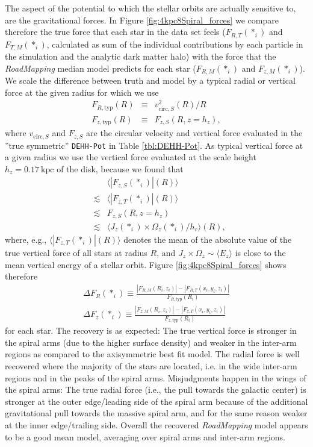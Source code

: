 \documentclass[iop,revtex4,numberedappendix,appendixfloats]{emulateapj}
\newcommand{\RM}{{\sl RoadMapping}}
\begin{document}
The aspect of the potential to which the stellar orbits are actually sensitive to, are the gravitational forces. In Figure \ref{fig:4kpc8Spiral_forces} we compare therefore the true force that each star in the data set feels ($F_{R,T}(*_i)$ and $F_{T,M}(*_i)$, calculated as sum of the individual contributions by each particle in the simulation and the analytic dark matter halo) with the force that the \RM{} median model predicts for each star ($F_{R,M}(*_i)$ and $F_{z,M}(*_i)$). We scale the difference between truth and model by a typical radial or vertical force at the given radius for which we use
\begin{eqnarray}
F_{R,\text{typ}}(R) &\equiv& v^2_{\text{circ},S}(R) / R\\
F_{z,\text{typ}}(R) &\equiv& F_{z,S}(R,z=h_z),
\end{eqnarray}
where $v_{\text{circ},S}$ and $F_{z,S}$ are the circular velocity and vertical force evaluated in the ''true symmetric'' \texttt{DEHH-Pot} in Table \ref{tbl:DEHH-Pot}. As typical vertical force at a given radius we use the vertical force evaluated at the scale height $h_z=0.17~\text{kpc}$ of the disk, because we found that 
\begin{eqnarray*} 
&&\langle |F_{z,S} (*_i)| (R) \rangle \\
&\lesssim& \langle |F_{z,T}(*_i)|  (R) \rangle\\
&\lesssim& F_{z,S}(R,z=h_z) \\
&\lesssim& \langle J_z(*_i) \times \Omega_z(*_i) / h_r \rangle (R),
\end{eqnarray*}
where, e.g., $\langle |F_{z,T}(*_i)|  (R) \rangle$ denotes the mean of the absolute value of the true vertical force of all stars at radius $R$, and $J_z \times \Omega_z \sim \langle E_z \rangle$ is close to the mean vertical energy of a stellar orbit. Figure \ref{fig:4kpc8Spiral_forces} shows therefore
\begin{eqnarray}
\Delta F_R(*_i) \equiv \frac{|F_{R,M}(R_i,z_i)| - |F_{R,T}(x_i,y_i,z_i)|}{F_{R,\text{typ}}(R_i)}\label{eq:delta_FR}\\
\Delta F_z(*_i) \equiv \frac{|F_{z,M}(R_i,z_i)| - |F_{z,T}(x_i,y_i,z_i)|}{F_{z,\text{typ}}(R_i)}\label{eq:delta_Fz}
\end{eqnarray}
for each star. The recovery is as expected: The true vertical force is stronger in the spiral arms (due to the higher surface density) and weaker in the inter-arm regions as compared to the axisymmetric best fit model. The radial force is well recovered where the majority of the stars are located, i.e. in the wide inter-arm regions and in the peaks of the spiral arms. Misjudgments happen in the wings of the spiral arms: The true radial force (i.e., the pull towards the galactic center) is stronger at the outer edge/leading side of the spiral arm because of the additional gravitational pull towards the massive spiral arm, and for the same reason weaker at the inner edge/trailing side. Overall the recovered \RM{} model appears to be a good mean model, averaging over spiral arms and inter-arm regions.
\end{document}
